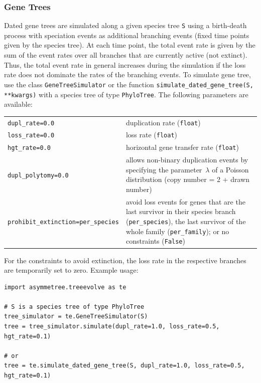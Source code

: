 \documentclass[hidelinks,11pt]{article}
\newcommand{\sq}{\textquotesingle}
\begin{document}
\subsubsection{Gene Trees}

Dated gene trees are simulated along a given species tree \texttt{S} using a 
birth-death process \citep{kendall1948,gillespie1976} with speciation events as 
additional branching events (fixed time points given by the species tree). At 
each time point, the total event rate is given by the sum of the event rates 
over all branches that are currently active (not extinct).
Thus, the total event rate in general increases during the simulation if the 
loss rate does not dominate the rates of the branching events.
To simulate gene tree, use the class \texttt{GeneTreeSimulator} or the function 
\texttt{simulate\_dated\_gene\_tree(S, **kwargs)} with a species tree of type 
\texttt{PhyloTree}.
The following parameters are available:

\vspace{3mm}
{\small\centering
\begin{longtable}{ p{4.0cm} p{9cm} }
	\texttt{dupl\_rate=0.0} & duplication rate (\texttt{float})\\
  \texttt{loss\_rate=0.0} & loss rate (\texttt{float})\\
  \texttt{hgt\_rate=0.0} & horizontal gene transfer rate (\texttt{float})\\
	\texttt{dupl\_polytomy=0.0}  & allows non-binary duplication events by specifying
	the parameter~$\lambda$ of a Poisson distribution (copy number = 2 + drawn number)\\
	\texttt{prohibit\_extinction=\newline \sq per\_species\sq}  & avoid loss
	events for genes that are the last survivor in their species branch
	(\texttt{\sq per\_species\sq}), the last survivor of the whole family
	(\texttt{\sq per\_family\sq}); or no constraints  (\texttt{False})
\end{longtable}
}
\vspace{3mm}

\noindent
For the constraints to avoid extinction, the loss rate in the respective branches are temporarily set to zero.
Example usage:

\begin{adjustwidth}{1cm}{1cm}\vspace{2mm}
\begin{verbatim}
import asymmetree.treeevolve as te

# S is a species tree of type PhyloTree
tree_simulator = te.GeneTreeSimulator(S)
tree = tree_simulator.simulate(dupl_rate=1.0, loss_rate=0.5, hgt_rate=0.1)

# or
tree = te.simulate_dated_gene_tree(S, dupl_rate=1.0, loss_rate=0.5, hgt_rate=0.1)
\end{verbatim}
\end{adjustwidth}
\end{document}
